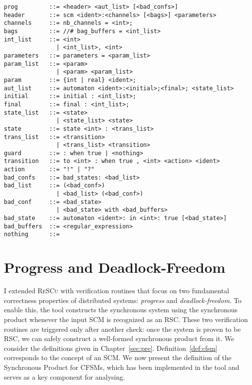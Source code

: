 \begin{lstlisting}[language={},caption={Simplified SCM grammar},
    keywordstyle=\color{blue}\bfseries,label={lst:scm-grammar}] 
prog         ::= <header> <aut_list> [<bad_confs>]
header       ::= scm <ident>:<channels> [<bags>] <parameters>
channels     ::= nb_channels = <int>;
bags         ::= //# bag_buffers = <int_list>
int_list     ::= <int>
               | <int_list>, <int>
parameters   ::= parameters = <param_list>
param_list   ::= <param>
               | <param> <param_list>
param        ::= {int | real} <ident>;
aut_list     ::= automaton <ident>:<initial>;<final>; <state_list>
initial      ::= initial : <int_list>;
final        ::= final : <int_list>;
state_list   ::= <state>
               | <state_list> <state>
state        ::= state <int> : <trans_list>
trans_list   ::= <transition>
               | <trans_list> <transition>
guard        ::= : when true | <nothing>
transition   ::= to <int> : when true , <int> <action> <ident>
action       ::= "!" | "?"
bad_confs    ::= bad_states: <bad_list>
bad_list     ::= (<bad_conf>)
               | <bad_list> (<bad_conf>)
bad_conf     ::= <bad_state>
               | <bad_state> with <bad_buffers>
bad_state    ::= automaton <ident>: in <int>: true [<bad_state>]
bad_buffers  ::= <regular_expression>
nothing      ::= 
\end{lstlisting}

\section{Progress and Deadlock-Freedom}
I extended \textsc{ReSCu} with verification routines that focus on two
fundamental correctness properties of distributed systems: \emph{progress} and
\emph{deadlock-freedom}. To enable this, the tool constructs the synchronous
system using the synchronous product whenever the input SCM is recognized as an
RSC. These two verification routines are triggered only after another check: 
once the system is proven to be RSC, we can safely construct a well-formed 
synchronous product from it. We consider the definitions given in Chapter~\ref{sec:pre}.
Definition~\ref{def:cfsm} corresponds to the concept of an SCM. We now present the
definition of the Synchronous Product for CFSMs, which has been implemented in the
tool and serves as a key component for analysing.

